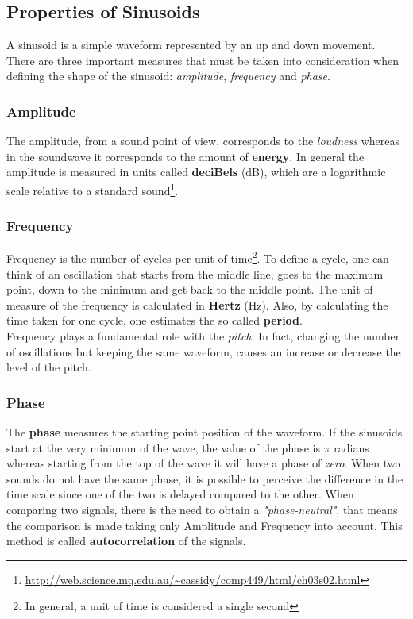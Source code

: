 \subsection{Properties of Sinusoids}
\label{sub:prop_of_sinusoids}
A sinusoid is a simple waveform represented by an up and down movement. There are three important measures that must be taken into consideration when defining the shape of the sinusoid: \textit{amplitude}, \textit{frequency} and \textit{phase}.

\subsubsection{Amplitude}
The amplitude, from a sound point of view, corresponds to the \textit{loudness} whereas in the soundwave it corresponds to the amount of \textbf{energy}. In general the amplitude is measured in units called \textbf{deciBels} (dB), which are a logarithmic scale relative to a standard sound\footnote{\url{http://web.science.mq.edu.au/~cassidy/comp449/html/ch03s02.html}}.

\subsubsection{Frequency}
Frequency is the number of cycles per unit of time\footnote{In general, a unit of time is considered a single second}. To define a cycle, one can think of an oscillation that starts from the middle line, goes to the maximum point, down to the minimum and get back to the middle point. The unit of measure of the frequency is calculated in \textbf{Hertz} (Hz). Also, by calculating the time taken for one cycle, one estimates the so called \textbf{period}. \\
\noindent Frequency plays a fundamental role with the \textit{pitch}. In fact, changing the number of oscillations but keeping the same waveform, causes an increase or decrease the level of the pitch.

\subsubsection{Phase}
The \textbf{phase} measures the starting point position of the waveform. If the sinusoids start at the very minimum of the wave, the value of the phase is $\pi$ radians whereas starting from the top of the wave it will have a phase of \textit{zero}. When two sounds do not have the same phase, it is possible to perceive the difference in the time scale since one of the two is delayed compared to the other. When comparing two signals, there is the need to obtain a \textit{"phase-neutral"}, that means the comparison is made taking only Amplitude and Frequency into account. This method is called \textbf{autocorrelation} of the signals.

